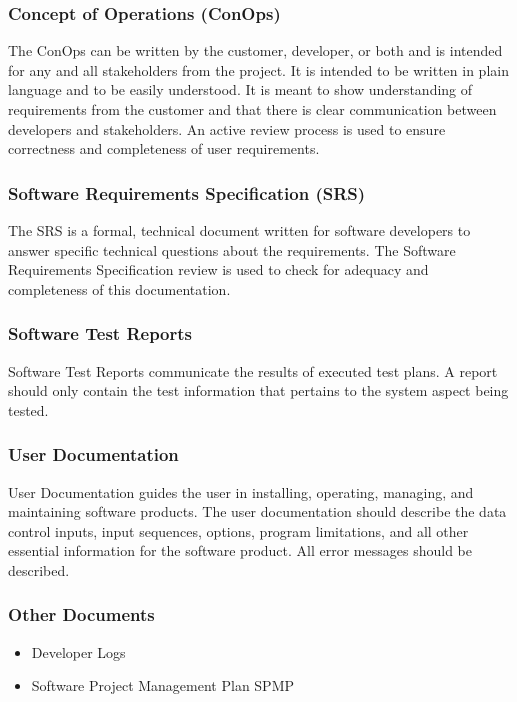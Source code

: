 \documentclass[a3paper, 11pt]{article}
\begin{document}
\subsubsection{Concept of Operations (ConOps)}
The ConOps can be written by the customer, developer, or both and is intended for any and all stakeholders from the project. It is intended to be written in plain language and to be easily understood. It is meant to show understanding of requirements from the customer and that there is clear communication between developers and stakeholders. An active review process is used to ensure correctness and completeness of user requirements. 

\subsubsection{Software Requirements Specification (SRS)}
The SRS is a formal, technical document written for software developers to answer specific technical questions about the 
requirements. The Software Requirements Specification review is used to check for adequacy and completeness of this documentation. 

\subsubsection{Software Test Reports}
Software Test Reports communicate the results of executed test plans. A report should only contain the test information that pertains to the system aspect being tested.

\subsubsection{User Documentation}
User Documentation guides the user in installing, operating, managing, and maintaining software products. The user documentation should describe the data control inputs, input sequences, options, program limitations, and all other essential information for the software product. All error messages should be described.

\subsubsection{Other Documents}

\begin{itemize}
	\setlength\itemsep{-0.25em}
	\item Developer Logs
	\item Software Project Management Plan {SPMP}
\end{itemize}
\par
\end{document}
